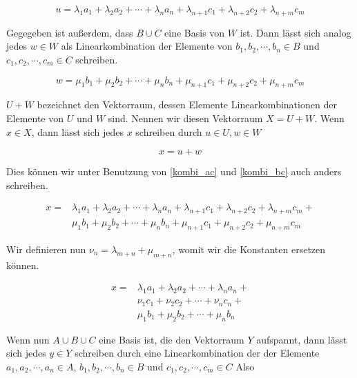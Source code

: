 \documentclass[a4paper,german,12pt,smallheadings]{scrartcl}
\begin{document}
\begin{equation}
  u = \lambda_1a_1 + \lambda_2a_2 + \dotsb + \lambda_na_n + \lambda_{n+1}c_1 + \lambda_{n+2}c_2 + \lambda_{n+m} c_m
  \label{kombi_ac}
\end{equation}

Gegegeben ist außerdem, dass $B \cup C$ eine Basis von $W$ ist. Dann lässt sich
analog jedes $w \in W$ als Linearkombination der Elemente von $b_1, b_2,
\dotsb, b_n \in B$ und $c_1, c_2, \dotsb, c_m \in C$ schreiben.

\begin{equation}
  w = \mu_1b_1 + \mu_2b_2 + \dotsb + \mu_nb_n + \mu_{n+1}c_1 + \mu_{n+2}c_2 + \mu_{n+m} c_m
  \label{kombi_bc}
\end{equation}

$U + W$ bezeichnet den Vektorraum, dessen Elemente Linearkombinationen der
Elemente von $U$ und $W$ sind. Nennen wir diesen Vektorraum $X = U + W$. Wenn
$x \in X$, dann lässt sich jedes $x$ schreiben durch $u \in U, w \in W$

\begin{equation*}
  x = u + w
\end{equation*}

Dies können wir unter Benutzung von \ref{kombi_ac} und \ref{kombi_bc} auch
anders schreiben.

\begin{align*}
  x = &\lambda_1a_1 + \lambda_2a_2 + \dotsb + \lambda_na_n + \lambda_{n+1}c_1 +
       \lambda_{n+2}c_2 + \lambda_{n+m} c_m + \\
      &\mu_1b_1 + \mu_2b_2 + \dotsb + \mu_nb_n + \mu_{n+1}c_1 
       + \mu_{n+2}c_2 + \mu_{n+m} c_m
\end{align*}

Wir definieren nun $\nu_n = \lambda_{m+n} + \mu_{m+n}$, womit wir die Konstanten ersetzen können.

\begin{align*}
  x = &\lambda_1a_1 + \lambda_2a_2 + \dotsb + \lambda_na_n + \\
      &\nu_1c_1     + \nu_2    c_2 + \dotsb + \nu_nc_n     + \\
      &\mu_1b_1     + \mu_2b_2     + \dotsb + \mu_nb_n
\end{align*}

Wenn nun $A \cup B \cup C$ eine Basis ist, die den Vektorraum $Y$ aufspannt,
dann lässt sich jedes $y \in Y$ schreiben durch eine Linearkombination der der
Elemente $a_1, a_2, \dotsb, a_n \in A$, $b_1, b_2, \dotsb, b_n \in B$ und $c_1,
c_2, \dotsb, c_m \in C$  Also
\end{document}
